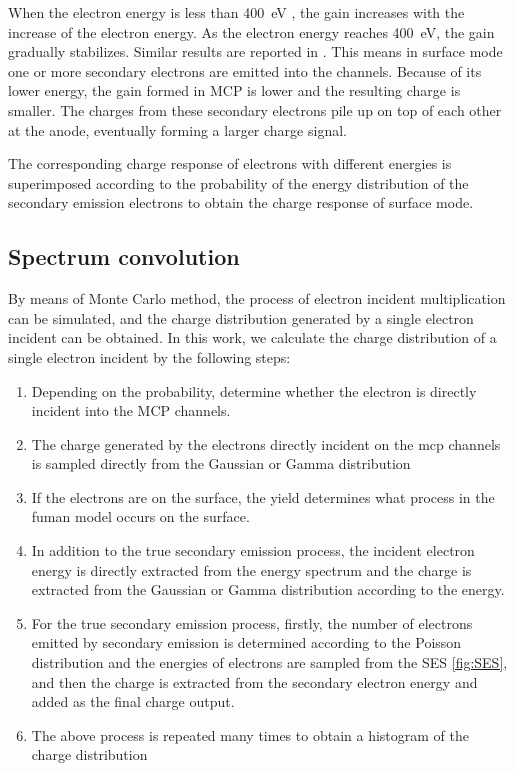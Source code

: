 \documentclass{article}
\begin{document}
When the electron energy is less than \SI{400}{eV} , the gain increases with the increase of the electron energy.
As the electron energy reaches \SI{400}{eV}, the gain gradually stabilizes.
Similar results are reported in \cite{2017MCP}.
This means in surface mode one or more secondary electrons are emitted into the channels.
Because of its lower energy, the gain formed in MCP is lower and the resulting charge is smaller.
The charges from these secondary electrons pile up on top of each other at the anode, eventually forming a larger charge signal.

The corresponding charge response of electrons with different energies is superimposed
according to the probability of the energy distribution of the secondary emission electrons
to obtain the charge response of surface mode.

\subsection{Spectrum convolution}\label{sec:convolution}
By means of Monte Carlo method, the process of electron incident multiplication can be simulated,
and the charge distribution generated by a single electron incident can be obtained.
In this work, we calculate the charge distribution of a single electron incident by the following steps:
\begin{enumerate}
    \item {Depending on the probability, determine whether the electron is directly incident into the MCP channels.}
    \item {The charge generated by the electrons directly incident on the mcp channels is
          sampled directly from the Gaussian or Gamma distribution}
    \item {If the electrons are on the surface, the yield determines
          what process in the fuman model occurs on the surface.}
    \item {In addition to the true secondary emission process,
          the incident electron energy is directly extracted from the energy spectrum
          and the charge is extracted from the Gaussian or Gamma distribution according to the energy.}
    \item {For the true secondary emission process,
          firstly, the number of electrons emitted by secondary emission 
          is determined according to the Poisson distribution
          and the energies of electrons are sampled from the SES \ref{fig:SES}, 
          and then the charge is extracted from the secondary electron energy
          and added as the final charge output. }
    \item {The above process is repeated many times to obtain a histogram of the charge distribution}
\end{enumerate}
\end{document}

